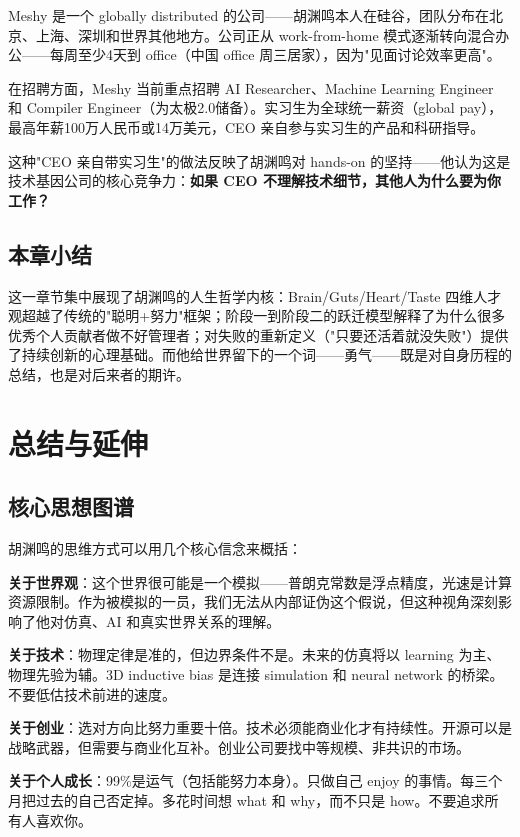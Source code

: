 \documentclass[a4paper]{article}
\begin{document}
Meshy 是一个 globally distributed 的公司——胡渊鸣本人在硅谷，团队分布在北京、上海、深圳和世界其他地方。公司正从 work-from-home 模式逐渐转向混合办公——每周至少4天到 office（中国 office 周三居家），因为"见面讨论效率更高"。

在招聘方面，Meshy 当前重点招聘 AI Researcher、Machine Learning Engineer 和 Compiler Engineer（为太极2.0储备）。实习生为全球统一薪资（global pay），最高年薪100万人民币或14万美元，CEO 亲自参与实习生的产品和科研指导。

这种"CEO 亲自带实习生"的做法反映了胡渊鸣对 hands-on 的坚持——他认为这是技术基因公司的核心竞争力：\textbf{如果 CEO 不理解技术细节，其他人为什么要为你工作？}

\subsection{本章小结}

这一章节集中展现了胡渊鸣的人生哲学内核：Brain/Guts/Heart/Taste 四维人才观超越了传统的"聪明+努力"框架；阶段一到阶段二的跃迁模型解释了为什么很多优秀个人贡献者做不好管理者；对失败的重新定义（"只要还活着就没失败"）提供了持续创新的心理基础。而他给世界留下的一个词——勇气——既是对自身历程的总结，也是对后来者的期许。

\section{总结与延伸}

\subsection{核心思想图谱}

胡渊鸣的思维方式可以用几个核心信念来概括：

\textbf{关于世界观}：这个世界很可能是一个模拟——普朗克常数是浮点精度，光速是计算资源限制。作为被模拟的一员，我们无法从内部证伪这个假说，但这种视角深刻影响了他对仿真、AI 和真实世界关系的理解。

\textbf{关于技术}：物理定律是准的，但边界条件不是。未来的仿真将以 learning 为主、物理先验为辅。3D inductive bias 是连接 simulation 和 neural network 的桥梁。不要低估技术前进的速度。

\textbf{关于创业}：选对方向比努力重要十倍。技术必须能商业化才有持续性。开源可以是战略武器，但需要与商业化互补。创业公司要找中等规模、非共识的市场。

\textbf{关于个人成长}：99\%是运气（包括能努力本身）。只做自己 enjoy 的事情。每三个月把过去的自己否定掉。多花时间想 what 和 why，而不只是 how。不要追求所有人喜欢你。
\end{document}

